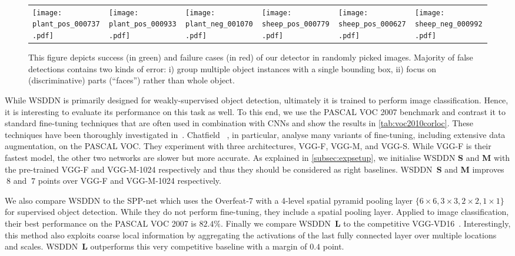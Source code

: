 \documentclass[10pt,twocolumn,letterpaper]{article}
\begin{document}
\begin{figure*}[t!]
\begin{tabular}{*{6}{C{0.13\textwidth}}}
  \texttt{[image: plant\_pos\_000737.pdf]}&
  \texttt{[image: plant\_pos\_000933.pdf]}&
  \texttt{[image: plant\_neg\_001070.pdf]}&
  \texttt{[image: sheep\_pos\_000779.pdf]}&
  \texttt{[image: sheep\_pos\_000627.pdf]}&
  \texttt{[image: sheep\_neg\_000992.pdf]}
  \end{tabular}
\caption{This figure depicts success (in green) and failure cases (in red) of our detector in randomly picked images. Majority of false detections contains two kinds of error: i) group multiple object instances with a single bounding box, ii) focus on (discriminative) parts (\eg ``faces'') rather than whole object. }
\label{fig:detexamples}
\end{figure*}%
While WSDDN is primarily designed for weakly-supervised object detection, ultimately it is trained to perform image classification. Hence, it is interesting to evaluate its performance on this task as well. To this end, we use the PASCAL VOC 2007 benchmark and contrast it to standard fine-tuning techniques that are often used in combination with CNNs and show the results in \cref{tab:voc2010corloc}. These techniques have been thoroughly investigated in~\cite{Chatfield14,He14,Oquab14}. Chatfield \etal~\cite{Chatfield14}, in particular, analyse many variants of fine-tuning, including extensive data augmentation, on the PASCAL VOC. They experiment with three architectures, VGG-F, VGG-M, and VGG-S. While VGG-F is their fastest model, the other two networks are slower but more accurate. As explained in \ref{subsec:expsetup}, we initialise WSDDN \textbf{S} and \textbf{M} with the pre-trained VGG-F and VGG-M-1024 respectively and thus they should be considered as right baselines. WSDDN~\textbf{S} and \textbf{M} improves $~8$ and $~7$ points over VGG-F and VGG-M-1024 respectively. 


We also compare WSDDN to the SPP-net \cite{He14} which uses the Overfeat-7 \cite{Sermanet13} with a 4-level spatial pyramid pooling layer $\{6\times 6, 3\times 3, 2\times 2, 1\times 1\}$ for supervised object detection. While they do not perform fine-tuning, they include a spatial pooling layer. Applied to image classification, their best performance on the PASCAL VOC 2007 is $82.4\%$. Finally we compare WSDDN~\textbf{L} to the competitive VGG-VD16~\cite{Simonyan15}. Interestingly, this method also exploits coarse local information by aggregating the activations of the last fully connected layer over multiple locations and scales. WSDDN~\textbf{L} outperforms this very competitive baseline with a margin of $0.4$ point.
\end{document}
